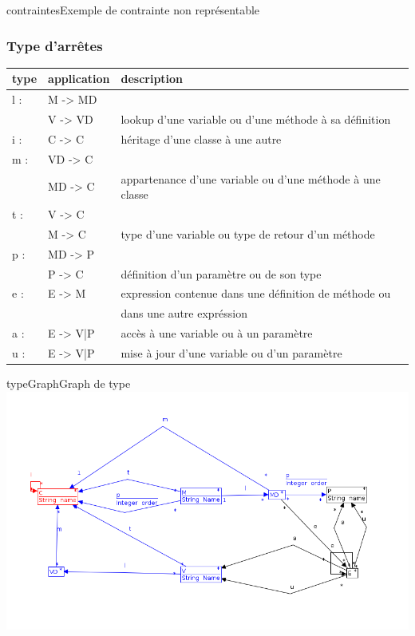 \documentclass[a4paper, 12pt]{article}
\begin{document}
\begin{figu}{contraintes}{Exemple de contrainte non représentable}
  \subsubsection{Type d'arrêtes}
  \begin{tabular}{ | l | l |  l |}
    \hline type & application & description  \\ \hline
    l : & M -> MD & \\ & V -> VD & lookup d'une variable ou d'une méthode à sa définition \\ \hline
    i : & C -> C &  héritage d'une classe à une autre  \\ \hline
    m : & VD -> C & \\ & MD -> C & appartenance d'une variable ou d'une méthode à une classe  \\ \hline
    t : & V -> C  & \\ &  M -> C & type d'une variable ou type de retour d'un méthode   \\ \hline
    p : & MD -> P  & \\ &  P -> C & définition d'un paramètre ou de son type     \\ \hline
    e : & E -> M & expression contenue dans une définition de méthode ou \\ & &  dans une autre expréssion    \\ \hline
    a : & E -> {V|P} & accès à une variable ou à un paramètre    \\ \hline
    u : & E -> {V|P} & mise à jour d'une variable ou d'un paramètre    \\ \hline
  \end{tabular}

  \begin{myfig}{typeGraph}{Graph de type}
    \includegraphics[width=\textwidth]{typeGraph.png}
  \end{myfig}


\end{figu}
\end{document}
